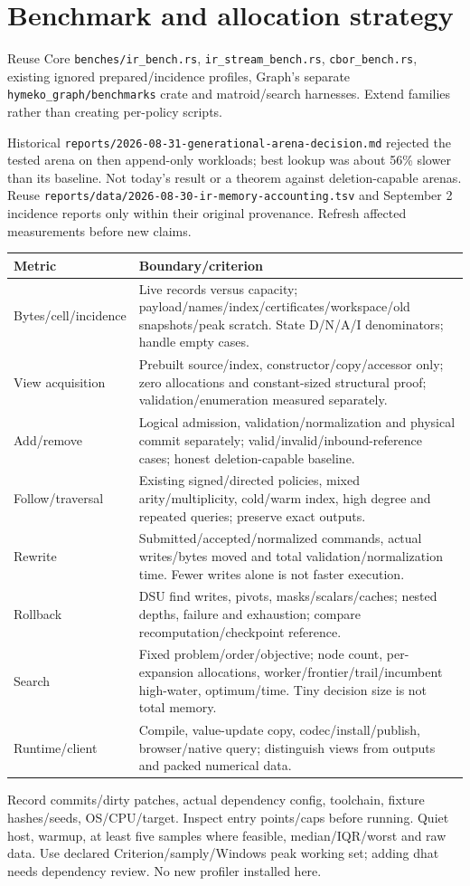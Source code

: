 \documentclass[10pt,a4paper]{article}
\newcommand{\code}[1]{{\small\nolinkurl{#1}}}
\begin{document}
\section{Benchmark and allocation strategy}
\label{sec:bench}
Reuse Core \code{benches/ir_bench.rs}, \code{ir_stream_bench.rs}, \code{cbor_bench.rs}, existing ignored prepared/incidence profiles, Graph's separate \code{hymeko_graph/benchmarks} crate and matroid/search harnesses. Extend families rather than creating per-policy scripts.

Historical \code{reports/2026-08-31-generational-arena-decision.md} rejected the tested arena on then append-only workloads; best lookup was about 56\% slower than its baseline. Not today's result or a theorem against deletion-capable arenas. Reuse \code{reports/data/2026-08-30-ir-memory-accounting.tsv} and September 2 incidence reports only within their original provenance. Refresh affected measurements before new claims.

\begin{longtable}{L{38mm}L{128mm}}
\toprule Metric & Boundary/criterion\\\midrule
Bytes/cell/incidence & Live records versus capacity; payload/names/index/certificates/workspace/old snapshots/peak scratch. State D/N/A/I denominators; handle empty cases.\\
View acquisition & Prebuilt source/index, constructor/copy/accessor only; zero allocations and constant-sized structural proof; validation/enumeration measured separately.\\
Add/remove & Logical admission, validation/normalization and physical commit separately; valid/invalid/inbound-reference cases; honest deletion-capable baseline.\\
Follow/traversal & Existing signed/directed policies, mixed arity/multiplicity, cold/warm index, high degree and repeated queries; preserve exact outputs.\\
Rewrite & Submitted/accepted/normalized commands, actual writes/bytes moved and total validation/normalization time. Fewer writes alone is not faster execution.\\
Rollback & DSU find writes, pivots, masks/scalars/caches; nested depths, failure and exhaustion; compare recomputation/checkpoint reference.\\
Search & Fixed problem/order/objective; node count, per-expansion allocations, worker/frontier/trail/incumbent high-water, optimum/time. Tiny decision size is not total memory.\\
Runtime/client & Compile, value-update copy, codec/install/publish, browser/native query; distinguish views from outputs and packed numerical data.\\
\bottomrule
\end{longtable}
Record commits/dirty patches, actual dependency config, toolchain, fixture hashes/seeds, OS/CPU/target. Inspect entry points/caps before running. Quiet host, warmup, at least five samples where feasible, median/IQR/worst and raw data. Use declared Criterion/samply/Windows peak working set; adding dhat needs dependency review. No new profiler installed here.
\end{document}
